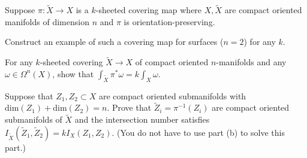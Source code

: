 Suppose $\pi:\tilde{X}\rightarrow X$ is a $k$-sheeted covering map
where $X,\tilde{X}$ are compact oriented manifolds of dimension $n$
and $\pi$ is orientation-preserving.
\begin{alist}
\item Construct an example of such a covering map for surfaces ($n=2$)
for any $k$.
\item For any $k$-sheeted covering $\tilde{X}\rightarrow X$ of compact
oriented $n$-manifolds and any $\omega\in \Omega^n(X)$, show that
$\int_{\tilde{X}}\pi^*\omega=k\int_X \omega$.
\item Suppose that $Z_1,Z_2\subset X$ are compact oriented
submanifolds with $\mathrm{dim}(Z_1)+\mathrm{dim}(Z_2)=n$.  Prove that
$\tilde{Z}_i=\pi^{-1}(Z_i)$ are compact oriented submanifolds of
$\tilde{X}$ and the intersection number satisfies
$I_{\tilde{X}}(\tilde{Z}_1,\tilde{Z}_2)=k I_X(Z_1,Z_2)$. (You do not
have to use part (b) to solve this part.)
\end{alist}
